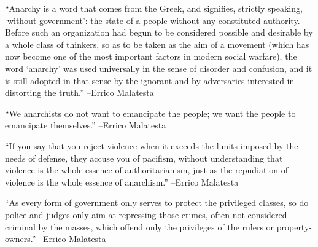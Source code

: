 \documentclass{article}%
\begin{document}
\linebreak%
\vspace{1mm}%
\begin{minipage}{\textwidth}%
\flushleft%
“Anarchy is a word that comes from the Greek, and signifies, strictly speaking, ‘without government’: the state of a people without any constituted authority. Before such an organization had begun to be considered possible and desirable by a whole class of thinkers, so as to be taken as the aim of a movement (which has now become one of the most important factors in modern social warfare), the word ‘anarchy’ was used universally in the sense of disorder and confusion, and it is still adopted in that sense by the ignorant and by adversaries interested in distorting the truth.”%
\linebreak%
\vspace{1mm}%
–Errico Malatesta%
\linebreak%
\vspace{1mm}%
\end{minipage}%
\linebreak%
\vspace{1mm}%
\begin{minipage}{\textwidth}%
\flushleft%
“We anarchists do not want to emancipate the people; we want the people to emancipate themselves.”%
\linebreak%
\vspace{1mm}%
–Errico Malatesta%
\linebreak%
\vspace{1mm}%
\end{minipage}%
\linebreak%
\vspace{1mm}%
\begin{minipage}{\textwidth}%
\flushleft%
“If you say that you reject violence when it exceeds the limits imposed by the needs of defense, they accuse you of pacifism, without understanding that violence is the whole essence of authoritarianism, just as the repudiation of violence is the whole essence of anarchism.”%
\linebreak%
\vspace{1mm}%
–Errico Malatesta%
\linebreak%
\vspace{1mm}%
\end{minipage}%
\linebreak%
\vspace{1mm}%
\begin{minipage}{\textwidth}%
\flushleft%
“As every form of government only serves to protect the privileged classes, so do police and judges only aim at repressing those crimes, often not considered criminal by the masses, which offend only the privileges of the rulers or property{-}owners.”%
\linebreak%
\vspace{1mm}%
–Errico Malatesta%
\linebreak%
\vspace{1mm}%
\end{minipage}%
\end{document}
